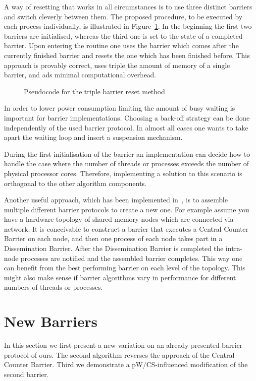 \documentclass[a4paper, 10pt]{article}
\newcommand*\cleartooddpage{
	\clearpage
	\ifthenelse{\isodd{\thepage}}
		{}
		{\newpage \mbox{} \clearpage}
}
\begin{document}
A way of resetting that works in all circumstances is to use three distinct barriers and switch cleverly between them. The proposed procedure, to be executed by each process individually, is illustrated in Figure~\ref{fig:pseudocode-triple-reset}. In the beginning the first two barriers are initialised, whereas the third one is set to the state of a completed barrier. Upon entering the routine one uses the barrier which comes after the currently finished barrier and resets the one which has been finished before. This approach is provably correct, uses triple the amount of memory of a single barrier, and ads minimal computational overhead.

\begin{figure}[htpb]
	\centering
	
	\caption{Pseudocode for the triple barrier reset method}
	\label{fig:pseudocode-triple-reset}
\end{figure}

In order to lower power consumption limiting the amount of busy waiting is important for barrier implementations. Choosing a back-off strategy can be done independently of the used barrier protocol. In almost all cases one wants to take apart the waiting loop and insert a suspension mechanism.

During the first initialisation of the barrier an implementation can decide how to handle the case where the number of threads or processes exceeds the number of physical processor cores. Therefore, implementing a solution to this scenario is orthogonal to the other algorithm components.

Another useful approach, which has been implemented in~\cite{rdma2}, is to assemble multiple different barrier protocols to create a new one. For example assume you have a hardware topology of shared memory nodes which are connected via network. It is conceivable to construct a barrier that executes a Central Counter Barrier on each node, and then one process of each node takes part in a Dissemination Barrier. After the Dissemination Barrier is completed the intra-node processes are notified and the assembled barrier completes.
This way one can benefit from the best performing barrier on each level of the topology.
This might also make sense if barrier algorithms vary in performance for different numbers of threads or processes.

\cleartooddpage
\section{New Barriers}
\label{sec:new}
In this section we first present a new variation on an already presented barrier protocol of ours. The second algorithm reverses the approach of the Central Counter Barrier. Third we demonstrate a pW/CS-influenced modification of the second barrier.
\end{document}
